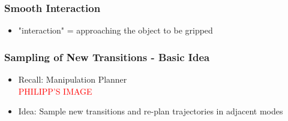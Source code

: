 \documentclass[12pt, %
			  t     %
]{beamer}%
\begin{document}
\begin{frame}
\frametitle{Smooth Interaction}
  \begin{itemize}
    \item "interaction" = approaching the object to be gripped
  \end{itemize}

  
  
\end{frame}

\begin{frame}
\frametitle{Sampling of New Transitions - Basic Idea}
\begin{itemize}
  \item Recall: Manipulation Planner\\ 
        \textcolor{red}{PHILIPP'S IMAGE}
  \item Idea: Sample new transitions and re-plan trajectories in adjacent modes
\end{itemize}


\end{frame}
\end{document}
